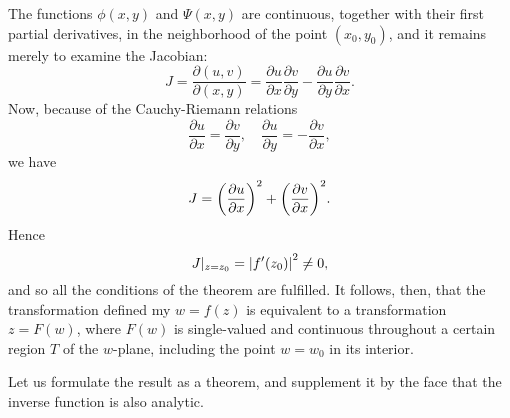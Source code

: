 \documentclass[twosided]{memoir}
\begin{document}
The functions $\phi (x,y)$ and $\Psi(x,y)$ are continuous, together with their first partial derivatives, in the neighborhood of the point $(x_0,y_0)$, and it remains merely to examine the Jacobian:
\begin{equation}\label{jacob}
	J=\frac{\partial (u,v)}{\partial (x,y)} =\frac{\partial u}{\partial x} \frac{\partial v}{\partial y} -\frac{\partial u}{\partial y} \frac{\partial v}{\partial x}.
\end{equation}
Now, because of the Cauchy-Riemann relations
\[
\frac{\partial u}{\partial x} =\frac{\partial v}{\partial y} , \quad \frac{\partial u}{\partial y} =-\frac{\partial v}{\partial x}
,\] we have
\[
	J=\pbr*{\frac{\partial u}{\partial x} } ^2+\pbr*{\frac{\partial v}{\partial x} } ^2
.\] Hence
\[
	J|_{z=z_0} =\abs*{f'(z_0)} ^2\neq 0
,\] and so all the conditions of the theorem are fulfilled. It follows, then, that the transformation defined my $w=f(z)$ is equivalent to a transformation $z=F(w)$, where $F(w)$ is single-valued and continuous throughout a certain region $T$ of the $w$-plane, including the point $w=w_0$ in its interior.

Let us formulate the result as a theorem, and supplement it by the face that the inverse function is also analytic.
\end{document}
